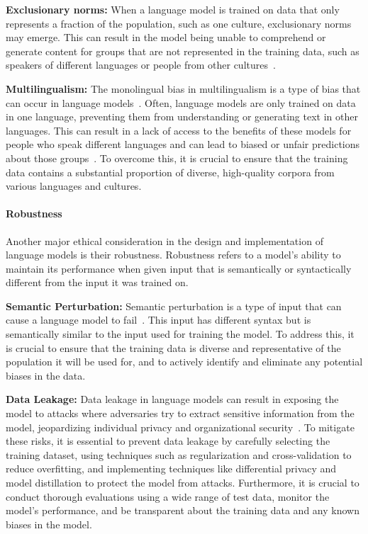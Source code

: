 \textbf{Exclusionary norms:} When a language model is trained on data that only represents a fraction of the population, such as one culture, exclusionary norms may emerge. This can result in the model being unable to comprehend or generate content for groups that are not represented in the training data, such as speakers of different languages or people from other cultures~\cite{weidinger2021ethical}.

\textbf{Multilingualism:} The monolingual bias in multilingualism is a type of bias that can occur in language models~\cite{talat2022you}. Often, language models are only trained on data in one language, preventing them from understanding or generating text in other languages. This can result in a lack of access to the benefits of these models for people who speak different languages and can lead to biased or unfair predictions about those groups~\cite{weidinger2021ethical,liang2021towards}. To overcome this, it is crucial to ensure that the training data contains a substantial proportion of diverse, high-quality corpora from various languages and cultures.

\paragraph{Robustness}
Another major ethical consideration in the design and implementation of language models is their robustness. Robustness refers to a model's ability to maintain its performance when given input that is semantically or syntactically different from the input it was trained on.

\textbf{Semantic Perturbation:} Semantic perturbation is a type of input that can cause a language model to fail~\cite{alzantot2018generating,li2020bert}. This input has different syntax but is semantically similar to the input used for training the model. To address this, it is crucial to ensure that the training data is diverse and representative of the population it will be used for, and to actively identify and eliminate any potential biases in the data.

\textbf{Data Leakage:} Data leakage in language models can result in exposing the model to attacks where adversaries try to extract sensitive information from the model, jeopardizing individual privacy and organizational security~\cite{carlini2021extracting}. To mitigate these risks, it is essential to prevent data leakage by carefully selecting the training dataset, using techniques such as regularization and cross-validation to reduce overfitting, and implementing techniques like differential privacy and model distillation to protect the model from attacks. Furthermore, it is crucial to conduct thorough evaluations using a wide range of test data, monitor the model's performance, and be transparent about the training data and any known biases in the model.

